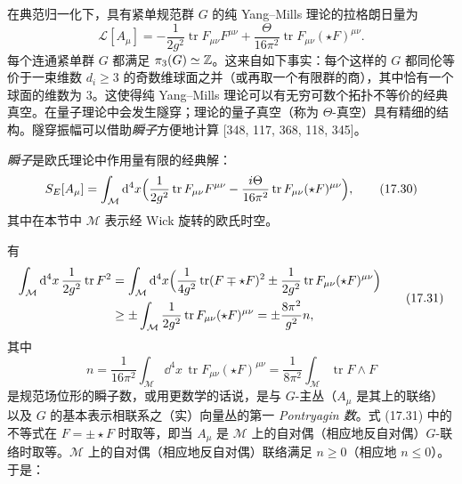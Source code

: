在典范归一化下，具有紧单规范群 $G$ 的纯 Yang--Mills 理论的拉格朗日量为
\begin{equation}
\mathcal{L}[A_\mu]=-\frac{1}{2g^2}\operatorname{tr}F_{\mu\nu}F^{\mu\nu}+\frac{\Theta}{16\pi^2}\operatorname{tr}F_{\mu\nu}(\star F)^{\mu\nu}.
\tag{17.29}
\end{equation}
每个连通紧单群 $G$ 都满足 $\pi_3(G)\simeq\mathbb{Z}$。这来自如下事实：每个这样的 $G$ 都同伦等价于一束维数 $d_i\ge3$ 的奇数维球面之并（或再取一个有限群的商），其中恰有一个球面的维数为 $3$。这使得纯 Yang--Mills 理论可以有无穷可数个拓扑不等价的经典真空。在量子理论中会发生隧穿；理论的量子真空（称为 $\Theta$-真空）具有精细的结构。隧穿振幅可以借助\emph{瞬子}方便地计算 [348, 117, 368, 118, 345]。

\begin{definition}[17.29]
\emph{瞬子}是欧氏理论中作用量有限的经典解：
\begin{equation}
S_E[A_\mu]=\int_{\mathcal{M}}\mathrm{d}^4x\Bigl(\frac{1}{2g^2}\operatorname{tr}F_{\mu\nu}F^{\mu\nu}-\frac{i\Theta}{16\pi^2}\operatorname{tr}F_{\mu\nu}(\star F)^{\mu\nu}\Bigr),
\tag{17.30}
\end{equation}
其中在本节中 $\mathcal{M}$ 表示经 Wick 旋转的欧氏时空。
\end{definition}

有
\begin{equation}
\begin{aligned}
\int_{\mathcal{M}}\mathrm{d}^4x\,\frac{1}{2g^2}\operatorname{tr}F^2&=\int_{\mathcal{M}}\mathrm{d}^4x\Bigl(\frac{1}{4g^2}\operatorname{tr}(F\mp\star F)^2\pm\frac{1}{2g^2}\operatorname{tr}F_{\mu\nu}(\star F)^{\mu\nu}\Bigr)\\
&\ge\pm\int_{\mathcal{M}}\frac{1}{2g^2}\operatorname{tr}F_{\mu\nu}(\star F)^{\mu\nu}=\pm\frac{8\pi^2}{g^2}n,
\end{aligned}
\tag{17.31}
\end{equation}
其中
\[
n=\frac{1}{16\pi^2}\int_{\mathcal{M}}\dd^4x\,\operatorname{tr}F_{\mu\nu}(\star F)^{\mu\nu}=\frac{1}{8\pi^2}\int_{\mathcal{M}}\operatorname{tr}F\wedge F
\]
是规范场位形的瞬子数，或用更数学的话说，是与 $G$-主丛（$A_\mu$ 是其上的联络）以及 $G$ 的基本表示相联系之（实）向量丛的第一 \emph{Pontryagin 数}。式 (17.31) 中的不等式在 $F=\pm\star F$ 时取等，即当 $A_\mu$ 是 $\mathcal{M}$ 上的自对偶（相应地反自对偶）$G$-联络时取等。$\mathcal{M}$ 上的自对偶（相应地反自对偶）联络满足 $n\ge0$（相应地 $n\le0$）。于是：


